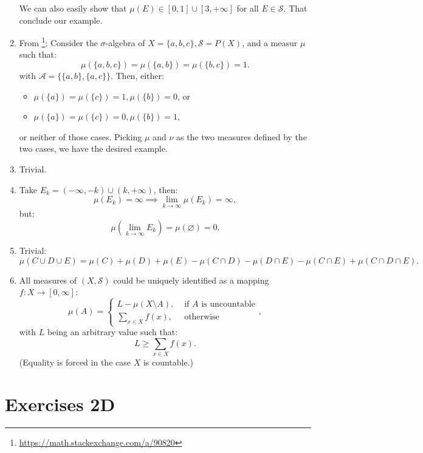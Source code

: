 \begin{enumerate}[label=\textbf{2C.\arabic*}]
  We can also easily show that \( \mu (E) \in [0, 1] \cup [3, +\infty] \) for all \(
  E \in \mathcal{S}\). That conclude our example.
\item From
  \footnote{\href{https://math.stackexchange.com/a/90820}{https://math.stackexchange.com/a/90820}}:
  Consider the \(
  \sigma \)-algebra of \( X = \{a, b, c\}, \mathcal{S} = P(X)  \), and a measur
  \( \mu  \) such that:
  \[
    \mu (\{a, b, c\}  ) = \mu (\{a, b\}  ) = \mu(\{b, c\}  ) = 1
  .\] with \( \mathcal{A} = \{\{a, b\}, \{a, c\}      \}   \). Then, either:
  \begin{itemize}
  \item \( \mu (\{a\}) = \mu(\{c\}) = 1, \mu(\{b\}  ) = 0   \), or
  \item \( \mu (\{a\}  )=\mu (\{c\}  ) = 0, \mu (\{b\}  ) = 1   \),
  \end{itemize}
  or neither of those cases. Picking \( \mu  \) and \( \nu  \) as the two
  measures defined by the two cases, we have the desired example.
\item Trivial.
\item Take \( E_{k} = (-\infty, -k) \cup (k, +\infty) \), then:
  \[ 
    \mu (E_{k}) = \infty \implies
    \lim_{k \to \infty} \mu (E_{k}) = \infty
  ,\] but:
  \[
    \mu \left( \lim_{k \to \infty} E_{k} \right)  = \mu (\varnothing) = 0
  .\] 
\item Trivial:
  \[
    \mu (C \cup D \cup E) = \mu (C) + \mu (D) + \mu (E) - \mu (C \cap D) - \mu
    (D \cap E) - \mu (C \cap E) + \mu (C \cap D \cap E)
  .\] 
\item \label{2C12} All measures of \( (X, \mathcal{S}) \) could be uniquely
  identified as a mapping \( f: X \to  [0, \infty]\):
  \[
    \mu (A) = \begin{cases}
      L - \mu (X \setminus A), &\text{ if } A \text{ is uncountable}\\
      \sum_{x \in X} f(x), & \text{ otherwise}
    \end{cases}
  ,\] 
  with \( L \) being an arbitrary value such that:
  \[
    L \ge \sum_{x \in X} f(x)
  .\] 
  (Equality is forced in the case \( X \) is countable.)
\end{enumerate}


\section{Exercises 2D} %
\label{sec:Exercises 2D}

